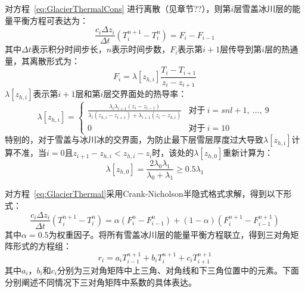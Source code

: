 对方程~\eqref{eq:GlacierThermalCons} 进行离散（见章节??），则第$i$层雪盖冰川层的能量平衡方程可表达为：
\begin{equation}\label{eq:GlacierThermal}
    \frac{c_i \Delta z_i}{\Delta t} \left(T^{n+1}_i - T^n_i\right) = F_i - F_{i-1}
\end{equation}
其中$\Delta t$表示积分时间步长，$n$表示时间步数，$F_i$表示第$i+1$层传导到第$i$层的热通量，其离散形式为：
\begin{equation}
    F_i = \lambda \left[z_{h,i}\right] \frac{T_i-T_{i+1}}{z_i-z_{i+1}}
\end{equation}
$\lambda\left[z_{h,i}\right]$表示第$i+1$层和第$i$层交界面处的热导率：
\begin{equation}
    \lambda \left[z_{h,i}\right] = \begin{cases}
        \frac{\lambda_i\lambda_{i+1}\left(z_i-z_{i-1}\right)}{\lambda_i\left(z_{h,i}-z_{i+1}\right)+\lambda_{i+1}\left(z_i-z_{h,i}\right)}  &\text{对于}\ i=snl+1,\ \ldots,\ 9 \\
        0 &\text{对于}\ i=10
    \end{cases}
\end{equation}
特别的，对于雪盖与冰川冰的交界面，为防止最下层雪层厚度过大导致$\lambda\left[z_{h,i}\right]$计算不准，当$i=0$且$z_{i+1}-z_{h,i}<z_{h,i}-z_i$时，该处的$\lambda\left[z_{h,0}\right]$重新计算为：
\begin{equation}
    \lambda\left[z_{h,0}\right]=\frac{2\lambda_0\lambda_1}{\lambda_0+\lambda_1} \geqslant 0.5\lambda_1
\end{equation}

对方程~\eqref{eq:GlacierThermal}采用Crank-Nicholson半隐式格式求解，得到以下形式：
\begin{equation}
    \frac{c_i\Delta z_i}{\Delta t}\left(T^{n+1}_i - T^n_i\right)=\alpha \left(F^n_i - F^n_{i-1}\right) + \left(1-\alpha \right) \left(F^{n+1}_i - F^{n+1}_{i-1}\right)
\end{equation}
其中$\alpha = 0.5$为权重因子。将所有雪盖冰川层的能量平衡方程联立，得到三对角矩阵形式的方程组：
\begin{equation}
    r_i = a_i T^{n+1}_{i-1} + b_i T^{n+1}_i + c_i T^{n+1}_{i+1}
\end{equation}
其中$a_i$，$b_i$和$c_i$分别为三对角矩阵中上三角、对角线和下三角位置中的元素。下面分别阐述不同情况下三对角矩阵中系数的具体表达。


